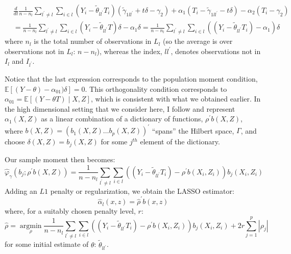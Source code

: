 \[
\begin{aligned}
& \frac{d}{d t} \frac{1}{n-n_l} \sum_{l^{\prime} \neq l} \sum_{i \in l}(Y_i- \tilde{\theta}_{ll^{\prime}} T_i) \left(\tilde{\gamma}_{1ll^{\prime}} + t \delta - \gamma_2\right) + \alpha_1\left(T_i - \tilde{\gamma}_{1ll^{\prime}} - t \delta\right) - \alpha_2\left(T_i -\gamma_2 \right) \\
&=\frac{1}{n-n_l} \sum_{l^{\prime} \neq l} \sum_{i \in l}\left(Y_i-\tilde {\theta}_{ll^{\prime}} T\right) \delta-\alpha_1 \delta=\frac{1}{n-n_l} \sum_{l^{\prime} \neq l} \sum_{i \in l}\left((Y_i-\tilde {\theta}_{ll^{\prime}} T_i)-\alpha_1\right) \delta
\end{aligned}
\]
where $n_l$ is the total number of observations in $L_l$ (so the average is over observations not in $L_l$: $n-n_l$), whereas the index, $ll^{\prime}$, denotes observations not in $I_l$ and $I_{l^{\prime}}$. 

Notice that the last expression corresponds to the population moment condition, $\mathbb{E}[(Y-\theta )-\alpha_{01}) \delta]=0$. This orthogonality condition corresponds to $\alpha_{01}= \mathbb{E}[(Y-\theta T) \mid X, Z]$, which is consistent with what we obtained earlier. In the high dimensional setting that we consider here, I follow \citet{chernozhukov2022locally} and represent $\alpha_1(X,Z)$ as a linear combination of a dictionary of functions, $\rho^{\prime}b(X,Z)$, where $b(X,Z)=(b_1(X,Z) \ldots b_p(X,Z))^{\prime}$ \enquote{spans} the Hilbert space, $\Gamma$, and choose $\delta(X,Z)=b_j(X, Z)$  for some $j^{th}$ element of the dictionary. 

Our sample moment then becomes:
\[
\hat{\varphi}_\gamma(b_j ; \rho^{\prime}b(X,Z))=\frac{1}{n-n_l} \sum_{l^{\prime} \neq l} \sum_{i \in l}((Y_i-\tilde {\theta}_{ll^{\prime}} T_i)-\rho^{\prime} b(X_i,Z_i)) b_j(X_i, Z_i)
\]
Adding an $L1$ penalty or regularization, we obtain the LASSO estimator:
\[\hat{\alpha}_l(x,z)=\hat{\rho}^{\prime} b(x,z)
\]
where, for a suitably chosen penalty level, $r$:
\begin{equation} \label{lasso}
    \hat{\rho}=\operatorname*{argmin}_\rho \frac{1}{n-n_l} \sum_{l^{\prime} \neq l} \sum_{i \in l}((Y_i-\tilde {\theta}_{ll^{\prime}} T_i)-\rho^{\prime} b(X_i,Z_i)) b_j(X_i, Z_i)+
2 r \sum_{j=1}^p|\rho_j|
\end{equation}
for some initial estimate of $\theta$: $\tilde{\theta}_{l l^{\prime}}$.

